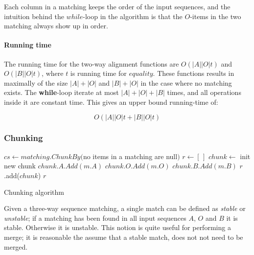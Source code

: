 \documentclass[11pt]{article}
\begin{document}
Each column in a matching keeps the order of the input sequences, and the intuition behind the $while$-loop in the algorithm is that the $O$-items in the two matching always show up in order.

\paragraph{Running time} The running time for the two-way alignment functions are $O(|A||O|t)$ and $O(|B||O|t)$, where $t$ is running time for $equality$. These functions results in maximally of the size $|A|+|O|$ and $|B|+|O|$ in the case where no matching exists. The \textbf{while}-loop iterate at most $|A|+|O|+|B|$ times, and all operations inside it are constant time. This gives an upper bound running-time of:

\begin{equation}
	O(|A||O| t + |B||O| t ) \nonumber
\end{equation}  


\subsubsection{Chunking}

\begin{algorithm}
\begin{algorithmic}
	\State $cs \gets matching.ChunkBy($no items in a matching are null$)$
	\State $r \gets [\,]$
		\State $chunk \gets $ init new chunk
				\State $chunk.A.Add(m.A)$
			\EndIf
				\State $chunk.O.Add(m.O)$
			\EndIf
				\State $chunk.B.Add(m.B)$
			\EndIf
		\EndFor
		\State $r$.add($chunk$)
	\EndFor
	\State \Return $r$
\EndFunction
\end{algorithmic}
\caption{Chunking algorithm}
  \label{CunkingAlgorithm}
\end{algorithm}

Given a three-way sequence matching, a single match can be defined as \textit{stable} or \textit{unstable}; if a matching has been found in all input sequences $A$, $O$ and $B$ it is stable. Otherwise it is unstable. This notion is quite useful for performing a merge; it is reasonable the assume that a stable match, does not not need to be merged.
\end{document}
